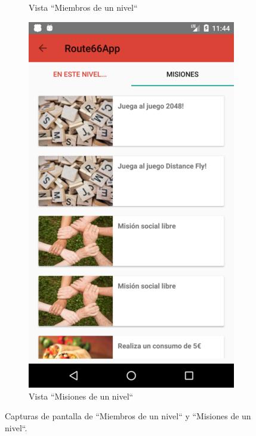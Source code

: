 \documentclass[twoside]{report}
\begin{document}
\begin{figure}[H]
\begin{center}
\begin{subfigure}[t]{.3\linewidth}
		\caption{Vista “Miembros de un nivel“}
	\end{subfigure}\hspace{5mm}%
	\begin{subfigure}[t]{.3\linewidth}
		\includegraphics[scale=0.25]{images/userguide/24.png}
		\caption{Vista “Misiones de un nivel“}
	\end{subfigure}\hspace{5mm}%
\caption{Capturas de pantalla de “Miembros de un nivel“ y “Misiones de un nivel“.}
\end{center}
\end{figure}
\end{document}
